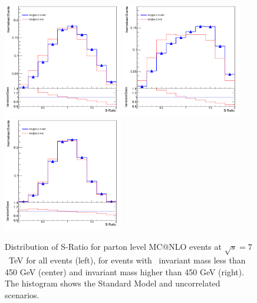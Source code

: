 \begin{figure}[htpb!]
\begin{center}
\includegraphics[width=52mm]{f/truth_rratio_truth_comparison}
\includegraphics[width=52mm]{f/truth_rratio_low_truth_comparison}
\includegraphics[width=52mm]{f/truth_rratio_high_truth_comparison}
\end{center}
\caption{Distribution of S-Ratio for parton level MC@NLO events at $\sqrt{s}=7$~TeV for all events (left), for events with \ttbar\ invariant mass less than 450 GeV (center) and invariant mass higher than 450 GeV (right). The histogram shows the Standard Model and uncorrelated scenarios. }
\label{fig:parton_sratio}
\end{figure} 

